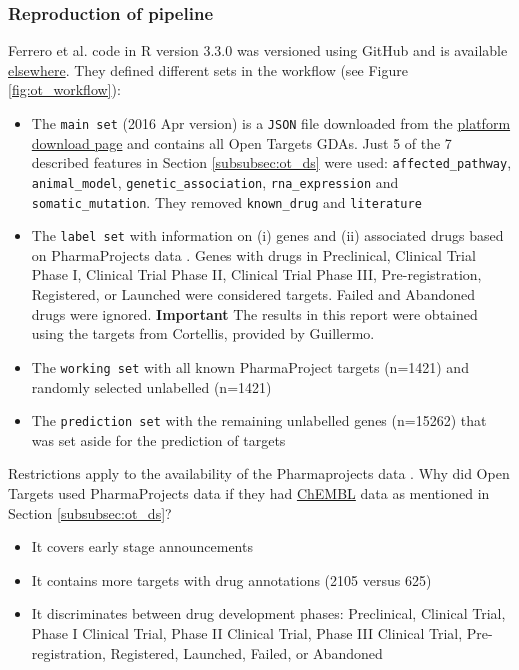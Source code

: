 \subsubsection{Reproduction of pipeline}
Ferrero et al. code in R version 3.3.0 was versioned using GitHub and is available \href{https://goo.gl/C4cSgQ}{elsewhere}.
They defined different sets in the workflow (see Figure \ref{fig:ot_workflow}):
\begin{itemize}
    \item The \texttt{main set} (2016 Apr version) is a \texttt{JSON} file downloaded from the \href{https://goo.gl/BdqKkH}{platform download page} and contains all Open Targets GDAs. Just 5 of the 7 described features in Section \ref{subsubsec:ot_ds} were used: \texttt{affected\_pathway}, \texttt{animal\_model}, \texttt{genetic\_association}, \texttt{rna\_expression} and \texttt{somatic\_mutation}. They removed \texttt{known\_drug} and \texttt{literature}
    
    \item The \texttt{label set} with information on (i) genes and (ii) associated drugs based on PharmaProjects data \cite{pharmaProjects}. Genes with drugs in Preclinical, Clinical Trial Phase I, Clinical Trial Phase II, Clinical Trial Phase III, Pre-registration, Registered, or Launched were considered targets. Failed and Abandoned drugs were ignored. \textbf{Important} The results in this report were obtained using the targets from Cortellis, provided by Guillermo.
    
    \item The \texttt{working set} with all known PharmaProject targets (n=1421) and randomly selected unlabelled (n=1421)
    
    \item The \texttt{prediction set} with the remaining unlabelled genes (n=15262) that was set aside for the prediction of targets
\end{itemize}

Restrictions apply to the availability of the Pharmaprojects data \cite{ferrero2017}. Why did Open Targets used PharmaProjects data if they had \href{https://goo.gl/StJTq2}{ChEMBL} \cite{chembl2014} data as mentioned in Section \ref{subsubsec:ot_ds}?
\begin{itemize}
    \item It covers early stage announcements
    \item It contains more targets with drug annotations (2105 versus 625)
    \item It discriminates between drug development phases: Preclinical, Clinical Trial, Phase I Clinical Trial, Phase II Clinical Trial, Phase III Clinical Trial, Pre-registration, Registered, Launched, Failed, or Abandoned
\end{itemize}


